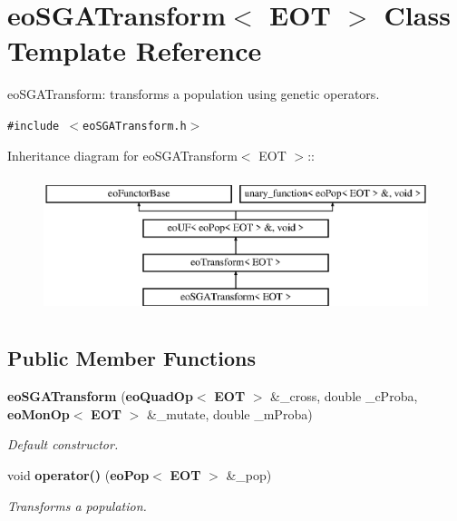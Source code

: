 \section{eo\-SGATransform$<$ EOT $>$ Class Template Reference}
\label{classeo_s_g_a_transform}
eo\-SGATransform: transforms a population using genetic operators.  


{\tt \#include $<$eo\-SGATransform.h$>$}

Inheritance diagram for eo\-SGATransform$<$ EOT $>$::\begin{figure}[H]
\begin{center}
\leavevmode
\includegraphics[height=4cm]{classeo_s_g_a_transform}
\end{center}
\end{figure}
\subsection*{Public Member Functions}
\begin{CompactItemize}
\item 
{\bf eo\-SGATransform} ({\bf eo\-Quad\-Op}$<$ {\bf EOT} $>$ \&\_\-cross, double \_\-c\-Proba, {\bf eo\-Mon\-Op}$<$ {\bf EOT} $>$ \&\_\-mutate, double \_\-m\-Proba)\label{classeo_s_g_a_transform_a0}

\begin{CompactList}\small\item\em Default constructor. \item\end{CompactList}\item 
void {\bf operator()} ({\bf eo\-Pop}$<$ {\bf EOT} $>$ \&\_\-pop)
\begin{CompactList}\small\item\em Transforms a population. \item\end{CompactList}\end{CompactItemize}
